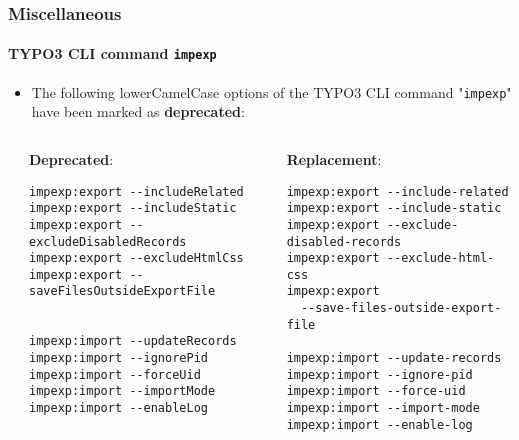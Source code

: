 %

\begin{frame}[fragile]
	\frametitle{Miscellaneous}
	\framesubtitle{TYPO3 CLI command \texttt{impexp}}


	\begin{itemize}
		\item The following lowerCamelCase options of the TYPO3 CLI command
			"\texttt{impexp}" have been marked as \textbf{deprecated}:
	\end{itemize}

	\begin{columns}[T]
		\begin{column}{.06\textwidth}
		\end{column}
		\begin{column}{.47\textwidth}
			\smaller\textbf{Deprecated}:\normalsize
\begin{lstlisting}
impexp:export --includeRelated
impexp:export --includeStatic
impexp:export --excludeDisabledRecords
impexp:export --excludeHtmlCss
impexp:export --saveFilesOutsideExportFile


impexp:import --updateRecords
impexp:import --ignorePid
impexp:import --forceUid
impexp:import --importMode
impexp:import --enableLog
\end{lstlisting}
		\end{column}
		\begin{column}{.47\textwidth}
			\smaller\textbf{Replacement}:\normalsize
\begin{lstlisting}
impexp:export --include-related
impexp:export --include-static
impexp:export --exclude-disabled-records
impexp:export --exclude-html-css
impexp:export
  --save-files-outside-export-file

impexp:import --update-records
impexp:import --ignore-pid
impexp:import --force-uid
impexp:import --import-mode
impexp:import --enable-log
\end{lstlisting}
		\end{column}
	\end{columns}

\end{frame}

